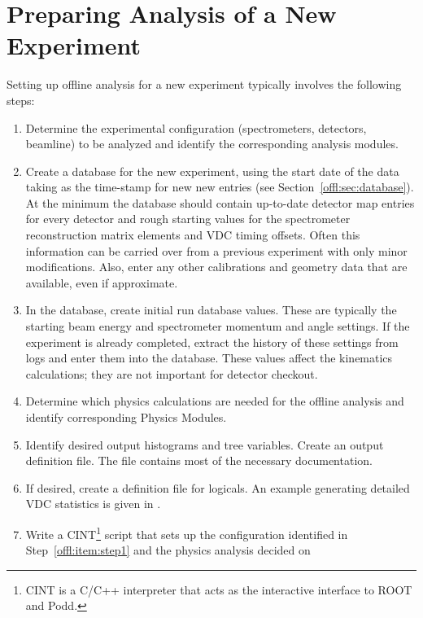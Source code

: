 {{\section{Preparing Analysis of a New Experiment}
\label{offl:sec:newexpt}
Setting up offline analysis for a new experiment typically 
involves the following steps:
\begin{enumerate}
  \item Determine the experimental configuration (spectrometers,
        detectors, beamline) to be analyzed and identify the corresponding 
	analysis modules. \label{offl:item:step1}
  \item Create a database for the new experiment, using the
        start date of the data taking as the time-stamp for new
	new entries (see Section~\ref{offl:sec:database}).
	At the minimum the database should contain up-to-date
	detector map entries for every detector and rough starting
	values for the spectrometer reconstruction matrix elements
	and VDC timing offsets. Often this information can be
	carried over from a previous experiment with only minor
	modifications. Also, enter any other calibrations and geometry
	data that are available, even if approximate.
  \item In the database, create initial run database values.
        These are typically the starting beam energy and spectrometer
	momentum and angle settings. If the experiment is already completed,
	extract the history of these settings from logs and enter them
	into the database. These values affect the kinematics calculations;
	they are not important for detector checkout.
  \item Determine which physics calculations are needed for the
        offline analysis and identify corresponding Physics Modules.
	\label{offl:item:step3}
  \item Identify desired output histograms and tree variables.
        Create an output definition file. The file 
         contains
	most of the necessary documentation.
  \item If desired, create a definition file for logicals.
        An example generating detailed VDC statistics is
	given in .
  \item Write a CINT\footnote{CINT is a C/C++ interpreter that acts
        as the interactive interface to ROOT and Podd.}
        script that sets up the configuration identified in 
	Step~\ref{offl:item:step1} and the physics analysis decided on

\end{enumerate}}}
